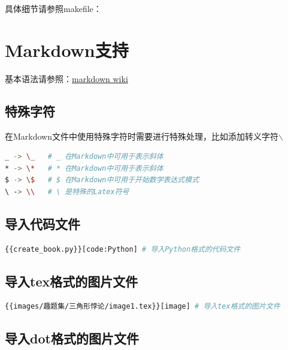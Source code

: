 \documentclass[export, 12pt, letterpaper]{ctexrep}
\begin{document}
具体细节请参照makefile：



\chapter{Markdown支持}

基本语法请参照：\href{https://simplemde.com/markdown-guide}{markdown wiki}

\section{特殊字符}

在Markdown文件中使用特殊字符时需要进行特殊处理，比如添加转义字符$\backslash$
\begin{lstlisting}[language=Bash]
_ -> \_   # _ 在Markdown中可用于表示斜体
* -> \*   # * 在Markdown中可用于表示斜体
$ -> \$   # $ 在Markdown中可用于开始数学表达式模式
\ -> \\   # \ 是特殊的Latex符号
\end{lstlisting}

\section{导入代码文件}

\begin{lstlisting}[language=Bash]
{{create_book.py}}[code:Python] # 导入Python格式的代码文件
\end{lstlisting}



\section{导入tex格式的图片文件}

\begin{lstlisting}[language=Bash]
{{images/趣题集/三角形悖论/image1.tex}}[image] # 导入tex格式的图片文件
\end{lstlisting}

\begin{center}

\end{center}


\section{导入dot格式的图片文件}
\end{document}
